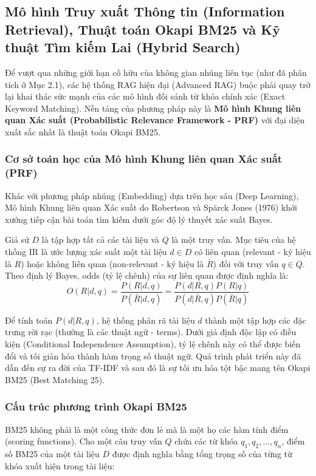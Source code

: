 \subsection{Mô hình Truy xuất Thông tin (Information Retrieval), Thuật toán Okapi BM25 và Kỹ thuật Tìm kiếm Lai (Hybrid Search)}

Để vượt qua những giới hạn cố hữu của không gian nhúng liên tục (như đã phân tích ở Mục 2.1), các hệ thống RAG hiện đại (Advanced RAG) buộc phải quay trở lại khai thác sức mạnh của các mô hình đối sánh từ khóa chính xác (Exact Keyword Matching). Nền tảng của phương pháp này là \textbf{Mô hình Khung liên quan Xác suất (Probabilistic Relevance Framework - PRF)} với đại diện xuất sắc nhất là thuật toán Okapi BM25.

\subsubsection{Cơ sở toán học của Mô hình Khung liên quan Xác suất (PRF)}
Khác với phương pháp nhúng (Embedding) dựa trên học sâu (Deep Learning), Mô hình Khung liên quan Xác suất do Robertson và Spärck Jones (1976) khởi xướng tiếp cận bài toán tìm kiếm dưới góc độ lý thuyết xác suất Bayes. 

Giả sử $D$ là tập hợp tất cả các tài liệu và $Q$ là một truy vấn. Mục tiêu của hệ thống IR là ước lượng xác suất một tài liệu $d \in D$ có liên quan (relevant - ký hiệu là $R$) hoặc không liên quan (non-relevant - ký hiệu là $\bar{R}$) đối với truy vấn $q \in Q$. Theo định lý Bayes, odds (tỷ lệ chênh) của sự liên quan được định nghĩa là:
\begin{equation}
    O(R|d, q) = \frac{P(R|d, q)}{P(\bar{R}|d, q)} = \frac{P(d|R, q) P(R|q)}{P(d|\bar{R}, q) P(\bar{R}|q)}
\end{equation}

Để tính toán $P(d|R, q)$, hệ thống phân rã tài liệu $d$ thành một tập hợp các đặc trưng rời rạc (thường là các thuật ngữ - terms). Dưới giả định độc lập có điều kiện (Conditional Independence Assumption), tỷ lệ chênh này có thể được biến đổi và tối giản hóa thành hàm trọng số thuật ngữ. Quá trình phát triển này đã dẫn đến sự ra đời của TF-IDF và sau đó là sự tối ưu hóa tột bậc mang tên Okapi BM25 (Best Matching 25).

\subsubsection{Cấu trúc phương trình Okapi BM25}
BM25 không phải là một công thức đơn lẻ mà là một họ các hàm tính điểm (scoring functions). Cho một câu truy vấn $Q$ chứa các từ khóa $q_1, q_2, \dots, q_n$, điểm số BM25 của một tài liệu $D$ được định nghĩa bằng tổng trọng số của từng từ khóa xuất hiện trong tài liệu:

